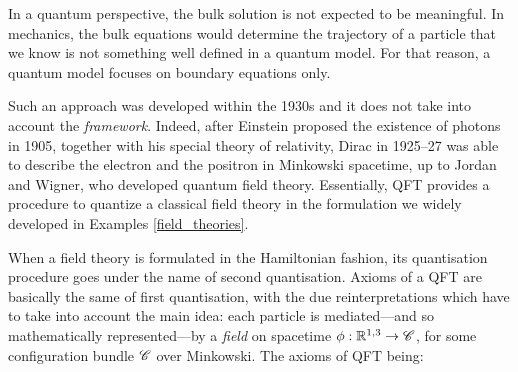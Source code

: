 \begin{remark}\label{no_traj}
    In a quantum perspective, the bulk solution is not expected to be meaningful. In mechanics, the bulk equations would determine the trajectory of a particle that we know is not something well defined in a quantum model. For that reason, a quantum model focuses on boundary equations only.
\end{remark}

Such an approach was developed within the 1930s and it does not take into account the \emph{framework}. Indeed, after Einstein proposed the existence of photons in 1905, together with his special theory of relativity, Dirac in 1925--27 was able to describe the electron and the positron in Minkowski spacetime, up to Jordan and Wigner, who developed quantum field theory. Essentially, QFT provides a procedure to quantize a classical field theory in the formulation we widely developed in Examples \ref{field_theories}.

When a 
field theory is formulated in the Hamiltonian fashion, its quantisation procedure goes under the name of second quantisation. Axioms of a QFT are basically the same of first quantisation, with the due reinterpretations which have to take into account the main idea: each particle is mediated---and so mathematically represented---by a \emph{field} on spacetime $\phi:\mathbb{R}^{1,3}\to\mathscr{C}$, for some configuration bundle $\mathscr{C}$ over Minkowski. The axioms of QFT being:

